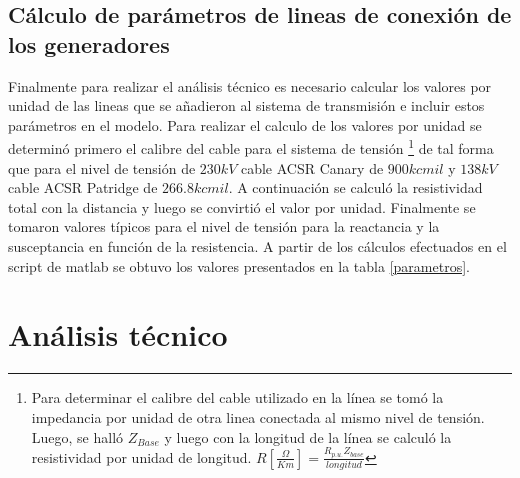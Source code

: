\documentclass{article}
\begin{document}
\subsection{Cálculo de parámetros de lineas de conexión de los generadores}
Finalmente para realizar el análisis técnico es necesario calcular los valores por unidad de las lineas que se añadieron al sistema de transmisión e incluir estos parámetros en el modelo. Para realizar el calculo de los valores por unidad se determinó primero el calibre del cable para el sistema de tensión \footnote{Para determinar el calibre del cable utilizado en la línea se tomó la impedancia por unidad de otra linea conectada al mismo nivel de tensión. Luego, se halló $Z_{Base}$ y luego con la longitud de la línea se calculó la resistividad por unidad de longitud. $ R[\frac{\Omega}{Km}]=\frac{R_{p.u.}Z_{base}}{longitud}$} de tal forma que para el nivel de tensión de $230kV$ cable ACSR Canary de $900kcmil$ y $138kV$cable ACSR Patridge de $266.8kcmil$. A continuación se calculó la resistividad total con la distancia y luego se convirtió el valor por unidad. Finalmente se tomaron valores típicos para el nivel de tensión para la reactancia y la susceptancia en función de la resistencia. A partir de los cálculos efectuados en el script de matlab  se obtuvo los valores presentados en la tabla \ref{parametros}.

\begin{table}[H]
\centering
\caption{Parámetros por unidad de lineas agregadas al sistema.}
\label{parametros}
\end{table}
\newpage




\section{Análisis técnico}
\end{document}
